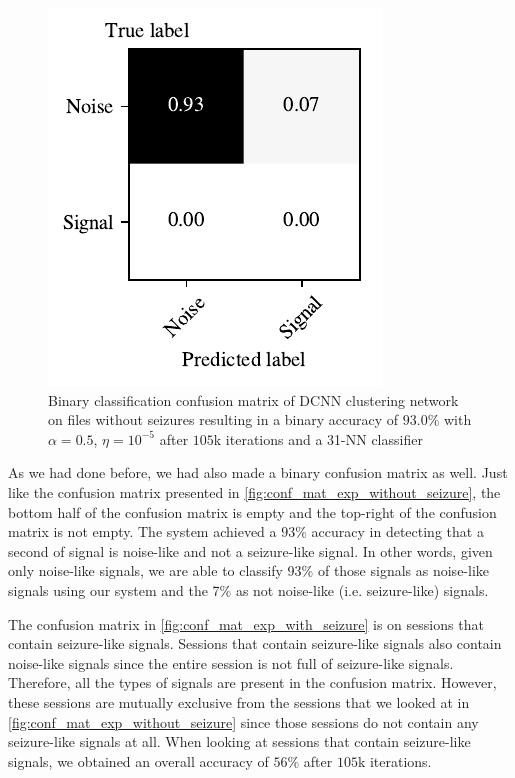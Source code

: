 \begin{figure}[!ht]
	\centering
	\includegraphics[width=0.425\linewidth]{pictures/conf_mat_exp_without_seizure_pooled.pdf}
	\caption[Binary Confusion Matrix on Sessions without Seizure-Like Signals]{Binary classification confusion matrix of DCNN clustering network on files without seizures resulting in a binary accuracy of $93.0\%$ with $\alpha = 0.5$, $\eta = 10^{-5}$ after $105$k iterations and a 31-NN classifier}\label{fig:conf_mat_exp_without_seizure_pooled}  
\end{figure}

As we had done before, we had also made a binary confusion matrix as well. Just like the confusion matrix presented in \cref{fig:conf_mat_exp_without_seizure}, the bottom half of the confusion matrix is empty and the top-right of the confusion matrix is not empty. The system achieved a $93\%$ accuracy in detecting that a second of signal is noise-like and not a seizure-like signal. In other words, given only noise-like signals, we are able to classify 93\% of those signals as noise-like signals using our system and the 7\% as not noise-like (i.e. seizure-like) signals. 

The confusion matrix in \cref{fig:conf_mat_exp_with_seizure} is on sessions that contain seizure-like signals. Sessions that contain seizure-like signals also contain noise-like signals since the entire session is not full of seizure-like signals. Therefore, all the types of signals are present in the confusion matrix. However, these sessions are mutually exclusive from the sessions that we looked at in \cref{fig:conf_mat_exp_without_seizure} since those sessions do not contain any seizure-like signals at all. When looking at sessions that contain seizure-like signals, we obtained an overall accuracy of $56\%$ after $105$k iterations.

